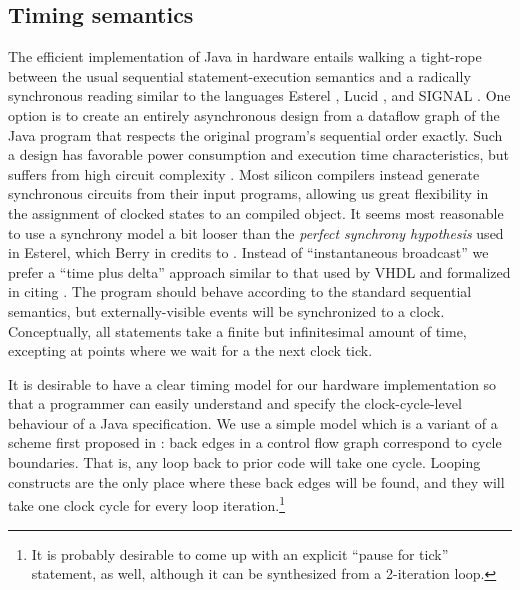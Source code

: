 \documentclass[11pt,notitlepage,twocolumn]{article}
\begin{document}
\subsection{Timing semantics}
The efficient implementation of Java in hardware entails walking a
tight-rope between the usual sequential statement-execution semantics
and a radically synchronous reading similar to the languages Esterel
\cite{berry:esterel_primer}, Lucid \cite{missing_reference}, and
SIGNAL \cite{amagbegnon95:signal}.  One option is to create an
entirely asynchronous design \cite{emerson97:async_design}
from a dataflow graph of the Java program
that respects the original program's sequential order exactly.  Such a
design has favorable power consumption and execution time
characteristics, but suffers from high circuit complexity
\cite{cheng97:diclasp, nanda97:universal}.
Most silicon compilers instead generate synchronous circuits from
their input programs, allowing us great flexibility in the assignment
of clocked states to an compiled object.  It seems most reasonable to
use a synchrony model a bit looser than the \textit{perfect synchrony
hypothesis} used in Esterel, which Berry in
\cite{berry92:hardware_esterel} credits to \cite{benveniste91:synchrony}.
Instead of ``instantaneous broadcast'' we prefer a ``time plus delta''
approach similar to that used by VHDL 
\cite{one_of_the_books_i_used_for_the_silicon_c_paper} and formalized
in \cite{gagne97:nonstandard} citing \cite{gagne96:nonstandard}.  The
program should behave according to the standard sequential semantics,
but externally-visible events will be synchronized to a clock.
Conceptually, all statements take a finite but infinitesimal amount of
time, excepting at points where we wait for a the next clock tick.

It is desirable to have a clear timing model for our hardware
implementation so that a programmer can easily understand and specify
the clock-cycle-level behaviour of a Java specification.  We use a
simple model which is a variant of a scheme first proposed in
\cite{galloway95:transmogrifier}:  back edges in a control flow graph
correspond to cycle boundaries.  That is, any loop back to prior code
will take one cycle.  Looping constructs are the only place where
these back edges will be found, and they will take one clock cycle for
every loop iteration.\footnote{It is probably desirable to come up
with an explicit ``pause for tick'' statement, as well, although it
can be synthesized from a 2-iteration loop.}
\end{document}
